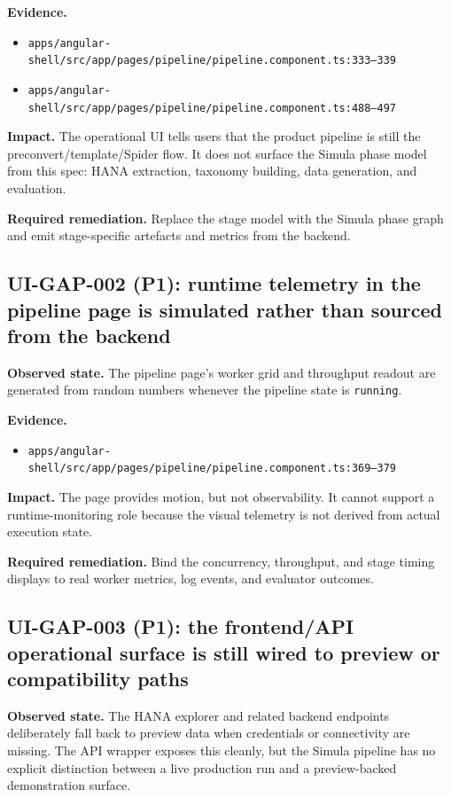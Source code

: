 \documentclass[12pt,a4paper,twoside]{report}
\begin{document}
\textbf{Evidence.}
\begin{itemize}
\item \texttt{apps/angular-shell/src/app/pages/pipeline/pipeline.component.ts:333--339}
\item \texttt{apps/angular-shell/src/app/pages/pipeline/pipeline.component.ts:488--497}
\end{itemize}

\textbf{Impact.}
The operational UI tells users that the product pipeline is still the
preconvert/template/Spider flow. It does not surface the Simula phase
model from this spec: HANA extraction, taxonomy building, data
generation, and evaluation.

\textbf{Required remediation.}
Replace the stage model with the Simula phase graph and emit
stage-specific artefacts and metrics from the backend.

\subsection*{UI-GAP-002 (P1): runtime telemetry in the pipeline page is simulated rather than sourced from the backend}
\textbf{Observed state.}
The pipeline page's worker grid and throughput readout are generated
from random numbers whenever the pipeline state is \texttt{running}.

\textbf{Evidence.}
\begin{itemize}
\item \texttt{apps/angular-shell/src/app/pages/pipeline/pipeline.component.ts:369--379}
\end{itemize}

\textbf{Impact.}
The page provides motion, but not observability. It cannot support a
runtime-monitoring role because the visual telemetry is not derived
from actual execution state.

\textbf{Required remediation.}
Bind the concurrency, throughput, and stage timing displays to real
worker metrics, log events, and evaluator outcomes.

\subsection*{UI-GAP-003 (P1): the frontend/API operational surface is still wired to preview or compatibility paths}
\textbf{Observed state.}
The HANA explorer and related backend endpoints deliberately fall back
to preview data when credentials or connectivity are missing. The API
wrapper exposes this cleanly, but the Simula pipeline has no explicit
distinction between a live production run and a preview-backed
demonstration surface.
\end{document}
